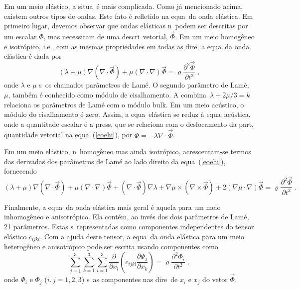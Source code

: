 Em um meio el\'astico, a situa\cao\ \'e mais complicada. Como j\'a
mencionado acima, existem outros tipos de ondas. Este fato \'e refletido
na equa\cao\ da onda el\'astica. Em primeiro lugar, devemos observar que
ondas el\'asticas n\ao\ podem ser descritas por um escalar $\Phi$, mas
necessitam de uma descri\cao\ vetorial, $\vec\Phi$. Em um meio
homog\^eneo e isotr\'opico, i.e., com as mesmas propriedades em todas as
dire\coes, a equa\cao\ da onda el\'astica \'e dada por
\begin{equation}
(\lambda+\mu) \nabla ( \nabla \cdot \vec\Phi) + \mu (\nabla \cdot \nabla)
\vec\Phi = \varrho
\frac{\partial^2 \vec\Phi}{\partial t^2} \; ,
\label{eoehi}
\end{equation}
onde $\lambda$ e $\mu$ s\ao\ os chamados par\^ametros de Lam\'e. O
segundo par\^ametro de Lam\'e, $\mu$, tamb\'em \'e conhecido como
m\'odulo de cisalhamento. A combina\cao\ $\lambda+2\mu/3 = k$ relaciona
os par\^ametros de Lam\'e com o m\'odulo bulk. Em um meio ac\'ustico, o
m\'odulo do cisalhamento \'e zero. Assim, a equa\cao\ el\'astica se reduz
\`a equa\cao\ ac\'ustica, onde a quantitade escalar \'e a press\ao, que
se relaciona com o deslocamento da part\icula, quantidade vetorial na
equa\cao\ (\ref{eoehi}), por $\Phi=-\lambda\nabla\cdot\vec\Phi$.

Em um meio el\'astico, n\ao\ homog\^eneo mas ainda isotr\'opico,
acrescentam-se termos das derivadas dos par\^ametros de Lam\'e ao
lado direito da equa\cao\ (\ref{eoehi}), fornecendo
\begin{equation}
(\lambda+\mu) \nabla ( \nabla \cdot \vec\Phi) + \mu (\nabla \cdot \nabla)
\vec\Phi
+(\nabla \cdot \vec\Phi) \nabla \lambda 
+\nabla\mu \times (\nabla \times \vec\Phi) 
+2(\nabla\mu \cdot \nabla) \vec\Phi 
= \varrho
\frac{\partial^2 \vec\Phi}{\partial t^2} \; .
\label{eoeii}
\end{equation}

Finalmente, a equa\cao\ da onda el\'astica mais geral \'e aquela para um
meio inhomog\^eneo e anisotr\'opico. Ela cont\'em, ao inv\'es dos dois
par\^ametros de Lam\'e, 21 par\^ametros. Estas s\ao\ representadas como
componentes independentes do tensor el\'astico $c_{ijkl}$. Com a ajuda
deste tensor, a equa\cao\ da onda el\'astica para um meio heterog\^eneo
e anisotr\'opico pode ser escrita usando componentes como
\begin{equation}
\sum\limits_{j=1}^3
\sum\limits_{k=1}^3
\sum\limits_{l=1}^3
\frac{\partial}{\partial x_l}
\left(c_{ijkl} \frac{\partial \Phi_j}{\partial x_k}\right)
= \varrho
\frac{\partial^2 \Phi_i}{\partial t^2} \; ,
\label{eoeia}
\end{equation}
onde $\Phi_i$ e $\Phi_j$ ($i,j=1,2,3$) s\ao\ as componentes nas
dire\coes\ de $x_i$ e $x_j$ do vetor $\vec\Phi$.

